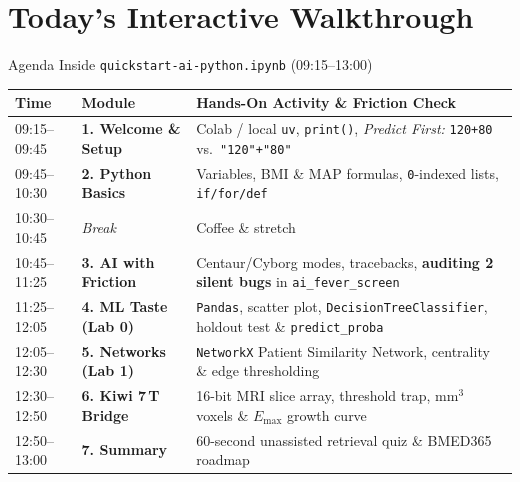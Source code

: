 \documentclass[aspectratio=169, 10pt]{beamer}
\begin{document}
\section{Today's Interactive Walkthrough}

\begin{frame}{Agenda Inside \texttt{quickstart-ai-python.ipynb} (09:15--13:00)}
    \footnotesize
    \begin{table}
        \centering
        \begin{tabular}{@{}llp{}@{}}
            \toprule
            \textbf{Time} & \textbf{Module} & \textbf{Hands-On Activity \& Friction Check} \\
            \midrule
            09:15--09:45 & \textbf{1. Welcome \& Setup} & Colab / local \texttt{uv}, \texttt{print()}, \textit{Predict First:} \texttt{120+80} vs.\ \texttt{"120"+"80"} \\
            09:45--10:30 & \textbf{2. Python Basics} & Variables, BMI \& MAP formulas, \texttt{0}-indexed lists, \texttt{if/for/def} \\
            10:30--10:45 & \textit{Break} & Coffee \& stretch \\
            10:45--11:25 & \textbf{3. AI with Friction} & Centaur/Cyborg modes, tracebacks, \textbf{auditing 2 silent bugs} in \texttt{ai\_fever\_screen} \\
            11:25--12:05 & \textbf{4. ML Taste (Lab 0)} & \texttt{Pandas}, scatter plot, \texttt{DecisionTreeClassifier}, holdout test \& \texttt{predict\_proba} \\
            12:05--12:30 & \textbf{5. Networks (Lab 1)} & \texttt{NetworkX} Patient Similarity Network, centrality \& edge thresholding \\
            12:30--12:50 & \textbf{6. Kiwi 7\,T Bridge} & 16-bit MRI slice array, threshold trap, $\text{mm}^3$ voxels \& $E_{\max}$ growth curve \\
            12:50--13:00 & \textbf{7. Summary} & 60-second unassisted retrieval quiz \& BMED365 roadmap \\
            \bottomrule
        \end{tabular}
    \end{table}
\end{frame}
\end{document}
